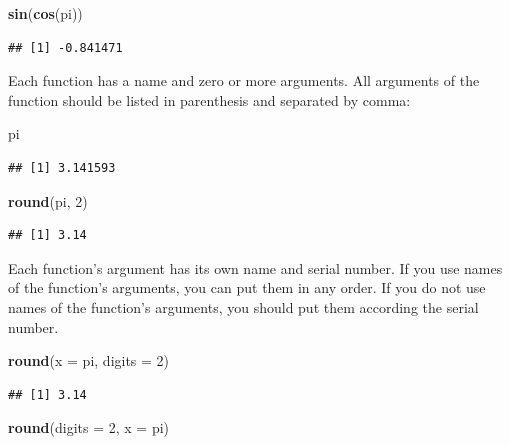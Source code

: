 \documentclass[
]{book}
\newenvironment{Shaded}{\begin{snugshade}}{\end{snugshade}}
\newcommand{\DataTypeTok}[1]{\textcolor[rgb]{0.13,0.29,0.53}{#1}}
\newcommand{\DecValTok}[1]{\textcolor[rgb]{0.00,0.00,0.81}{#1}}
\newcommand{\KeywordTok}[1]{\textcolor[rgb]{0.13,0.29,0.53}{\textbf{#1}}}
\newcommand{\NormalTok}[1]{#1}
\begin{document}
\begin{Shaded}
\begin{Highlighting}[]
\KeywordTok{sin}\NormalTok{(}\KeywordTok{cos}\NormalTok{(pi))}
\end{Highlighting}
\end{Shaded}

\begin{verbatim}
## [1] -0.841471
\end{verbatim}

Each function has a name and zero or more arguments. All arguments of the function should be listed in parenthesis and separated by comma:

\begin{Shaded}
\begin{Highlighting}[]
\NormalTok{pi}
\end{Highlighting}
\end{Shaded}

\begin{verbatim}
## [1] 3.141593
\end{verbatim}

\begin{Shaded}
\begin{Highlighting}[]
\KeywordTok{round}\NormalTok{(pi, }\DecValTok{2}\NormalTok{)}
\end{Highlighting}
\end{Shaded}

\begin{verbatim}
## [1] 3.14
\end{verbatim}

Each function's argument has its own name and serial number. If you use names of the function's arguments, you can put them in any order. If you do not use names of the function's arguments, you should put them according the serial number.

\begin{Shaded}
\begin{Highlighting}[]
\KeywordTok{round}\NormalTok{(}\DataTypeTok{x =}\NormalTok{ pi, }\DataTypeTok{digits =} \DecValTok{2}\NormalTok{)}
\end{Highlighting}
\end{Shaded}

\begin{verbatim}
## [1] 3.14
\end{verbatim}

\begin{Shaded}
\begin{Highlighting}[]
\KeywordTok{round}\NormalTok{(}\DataTypeTok{digits =} \DecValTok{2}\NormalTok{, }\DataTypeTok{x =}\NormalTok{ pi)}
\end{Highlighting}
\end{Shaded}
\end{document}

